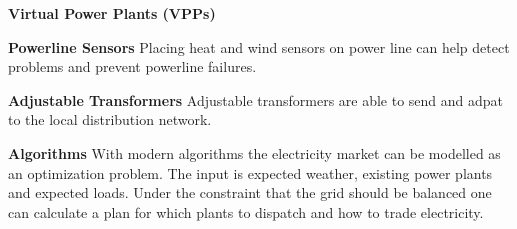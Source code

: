 \begin{labeling}{\textbf{Virtual Power Plants (VPPs)}}
    \item [\textbf{Powerline Sensors}]
    Placing heat and wind sensors on power line can help detect problems and prevent powerline failures.


    \item [\textbf{Adjustable Transformers}]
    Adjustable transformers are able to send and adpat to the local distribution network.


    \item [\textbf{Algorithms}]
    With modern algorithms the electricity market can be modelled as an optimization problem. The input is expected weather, existing power plants and expected loads. Under the constraint that the grid should be balanced one can calculate a plan for which plants to dispatch and how to trade electricity.

\end{labeling}

